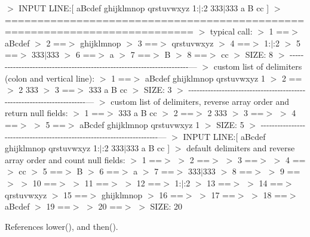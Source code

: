 $>$ I\+N\+P\+UT L\+I\+NE\+:\mbox{[} a\+Bcdef ghijklmnop qrstuvwxyz 1\+:$\vert$\+:2 333$\vert$333 a B cc \mbox{]} $>$ =========================================================================== $>$ typical call\+: $>$ 1 ==$>$ a\+Bcdef $>$ 2 ==$>$ ghijklmnop $>$ 3 ==$>$ qrstuvwxyz $>$ 4 ==$>$ 1\+:$\vert$\+:2 $>$ 5 ==$>$ 333$\vert$333 $>$ 6 ==$>$ a $>$ 7 ==$>$ B $>$ 8 ==$>$ cc $>$ S\+I\+ZE\+: 8 $>$ -\/-\/-\/-\/-\/-\/-\/-\/-\/-\/-\/-\/-\/-\/-\/-\/-\/-\/-\/-\/-\/-\/-\/-\/-\/-\/-\/-\/-\/-\/-\/-\/-\/-\/-\/-\/-\/-\/-\/-\/-\/-\/-\/-\/-\/-\/-\/-\/-\/-\/-\/-\/-\/-\/-\/-\/-\/-\/-\/-\/-\/-\/-\/-\/-\/-\/-\/-\/-\/-\/-\/--- $>$ custom list of delimiters (colon and vertical line)\+: $>$ 1 ==$>$ a\+Bcdef ghijklmnop qrstuvwxyz 1 $>$ 2 ==$>$ 2 333 $>$ 3 ==$>$ 333 a B cc $>$ S\+I\+ZE\+: 3 $>$ -\/-\/-\/-\/-\/-\/-\/-\/-\/-\/-\/-\/-\/-\/-\/-\/-\/-\/-\/-\/-\/-\/-\/-\/-\/-\/-\/-\/-\/-\/-\/-\/-\/-\/-\/-\/-\/-\/-\/-\/-\/-\/-\/-\/-\/-\/-\/-\/-\/-\/-\/-\/-\/-\/-\/-\/-\/-\/-\/-\/-\/-\/-\/-\/-\/-\/-\/-\/-\/-\/-\/--- $>$ custom list of delimiters, reverse array order and return null fields\+: $>$ 1 ==$>$ 333 a B cc $>$ 2 ==$>$ 2 333 $>$ 3 ==$>$ $>$ 4 ==$>$ $>$ 5 ==$>$ a\+Bcdef ghijklmnop qrstuvwxyz 1 $>$ S\+I\+ZE\+: 5 $>$ -\/-\/-\/-\/-\/-\/-\/-\/-\/-\/-\/-\/-\/-\/-\/-\/-\/-\/-\/-\/-\/-\/-\/-\/-\/-\/-\/-\/-\/-\/-\/-\/-\/-\/-\/-\/-\/-\/-\/-\/-\/-\/-\/-\/-\/-\/-\/-\/-\/-\/-\/-\/-\/-\/-\/-\/-\/-\/-\/-\/-\/-\/-\/-\/-\/-\/-\/-\/-\/-\/-\/--- $>$ I\+N\+P\+UT L\+I\+NE\+:\mbox{[} a\+Bcdef ghijklmnop qrstuvwxyz 1\+:$\vert$\+:2 333$\vert$333 a B cc \mbox{]} $>$ default delimiters and reverse array order and count null fields\+: $>$ 1 ==$>$ $>$ 2 ==$>$ $>$ 3 ==$>$ $>$ 4 ==$>$ cc $>$ 5 ==$>$ B $>$ 6 ==$>$ a $>$ 7 ==$>$ 333$\vert$333 $>$ 8 ==$>$ $>$ 9 ==$>$ $>$ 10 ==$>$ $>$ 11 ==$>$ $>$ 12 ==$>$ 1\+:$\vert$\+:2 $>$ 13 ==$>$ $>$ 14 ==$>$ qrstuvwxyz $>$ 15 ==$>$ ghijklmnop $>$ 16 ==$>$ $>$ 17 ==$>$ $>$ 18 ==$>$ a\+Bcdef $>$ 19 ==$>$ $>$ 20 ==$>$ $>$ S\+I\+ZE\+: 20 

References lower(), and then().

\mbox{\label{namespacem__strings_af3767887ce5c2373a6d9061ea6664bfc}} 
